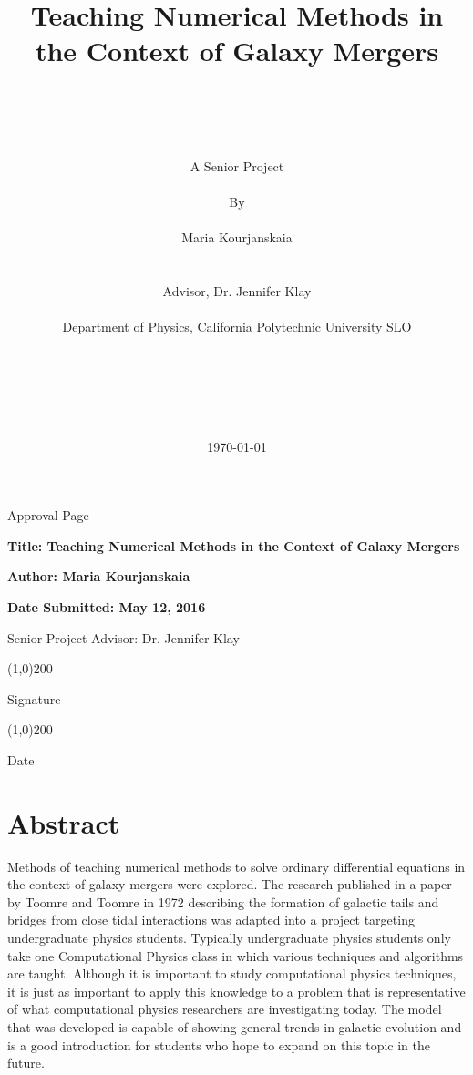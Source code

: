 \documentclass[11pt]{article}
\title{Teaching Numerical Methods in the Context of Galaxy Mergers}
\author
{\\
\\
\\
\\
A Senior Project
\\
\\
By
\\
\\
Maria Kourjanskaia
\\
\\
\\ 
\normalsize{Advisor, Dr. Jennifer Klay}
\\
\\
\normalsize{Department of Physics, California Polytechnic University SLO}\\
\\
\\
\\
\\
\\
}
\date{\today}
\begin{document}
\baselineskip21pt
\maketitle


\newpage

\begin{center}Approval Page\end{center}
\bigskip

\begin{flushleft}
\textbf{Title: Teaching Numerical Methods in the Context of Galaxy Mergers}
\medskip

\textbf{Author: Maria Kourjanskaia}
\medskip

\textbf{Date Submitted: May 12, 2016}
\end{flushleft}

\bigskip
\bigskip
\bigskip
\bigskip
\bigskip
\bigskip
\bigskip
\bigskip
\bigskip
\bigskip
\bigskip
\bigskip
\bigskip
\bigskip
\bigskip
\bigskip
\bigskip
\bigskip
\bigskip


\begin{flushright}
Senior Project Advisor: Dr. Jennifer Klay

\bigskip
\bigskip


\line(1,0){200}

Signature
\bigskip

\line(1,0){200}

Date



\end{flushright}




\newpage

\tableofcontents

\listoftables

\listoffigures

\newpage

\section{Abstract}
Methods of teaching numerical methods to solve ordinary differential equations in the context of galaxy mergers were explored. The research published in a paper by Toomre and Toomre in 1972 describing the formation of galactic tails and bridges from close tidal interactions was adapted into a project targeting undergraduate physics students. Typically undergraduate physics students only take one Computational Physics class in which various techniques and algorithms are taught. Although it is important to study computational physics techniques, it is just as important to apply this knowledge to a problem that is representative of what computational physics researchers are investigating today. The model that was developed is capable of showing general trends in galactic evolution and is a good introduction for students who hope to expand on this topic in the future.
\end{document}
